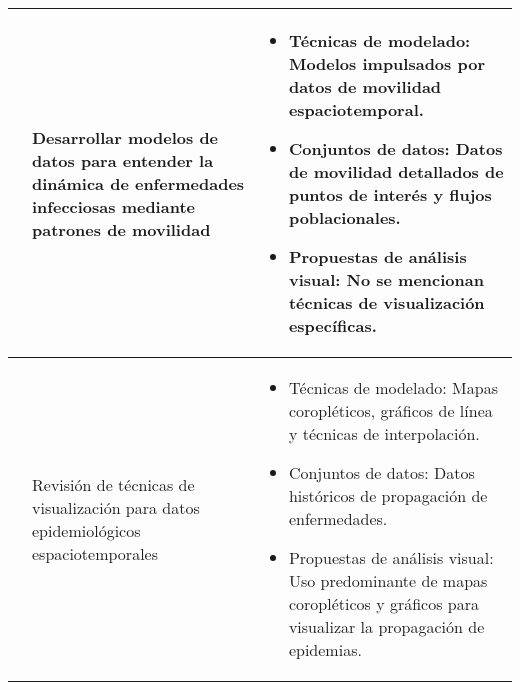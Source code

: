 \documentclass[sigconf]{acmart}
\begin{document}
\begin{table*}[h]
{\begin{tabular}{|p{1cm}|p{4cm}|p{11cm}|}
\cite{zhang2023data} & Desarrollar modelos de datos para entender la dinámica de enfermedades infecciosas mediante patrones de movilidad &
\begin{minipage}[t]{11cm}
  \begin{itemize}
    \item Técnicas de modelado: Modelos impulsados por datos de movilidad espaciotemporal.
    \item Conjuntos de datos: Datos de movilidad detallados de puntos de interés y flujos poblacionales.
    \item Propuestas de análisis visual: No se mencionan técnicas de visualización específicas.
  \end{itemize}
\end{minipage} \\ \hline

\cite{kim2024scoping} & Revisión de técnicas de visualización para datos epidemiológicos espaciotemporales &
\begin{minipage}[t]{11cm}
  \begin{itemize}
    \item Técnicas de modelado: Mapas coropléticos, gráficos de línea y técnicas de interpolación.
    \item Conjuntos de datos: Datos históricos de propagación de enfermedades.
    \item Propuestas de análisis visual: Uso predominante de mapas coropléticos y gráficos para visualizar la propagación de epidemias.
  \end{itemize}
\end{minipage} \\ \hline



\end{tabular}}
\label{tab:review_epidemic_modeling}
\end{table*}
\end{document}
